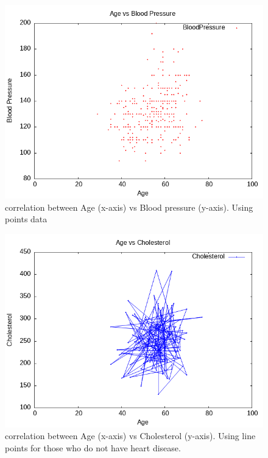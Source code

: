 \documentclass{article}
\begin{document}
\begin{figure}[H]
	\centering
	\includegraphics{question4_b.png}
	\caption{correlation between Age (x-axis) vs Blood pressure (y-axis).
		Using points data}
	\label{figure2}
\end{figure}
\begin{figure}[H]
	\centering
	\includegraphics{question4_c.png}
	\caption{correlation between Age (x-axis) vs Cholesterol (y-axis).
		Using line points for those who do not have heart disease.}
	\label{figure3}
\end{figure}
\end{document}
